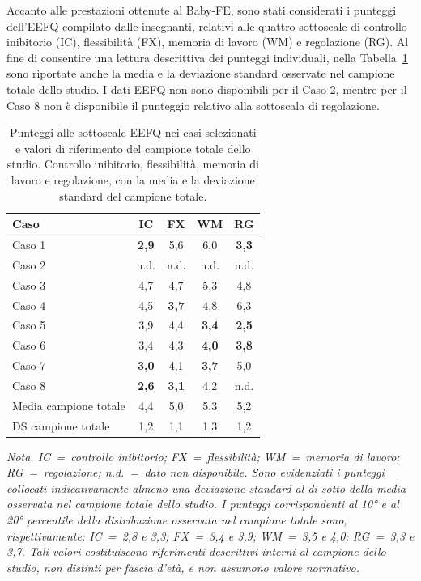 Accanto alle prestazioni ottenute al Baby-FE, sono stati considerati i punteggi dell'EEFQ compilato dalle insegnanti, relativi alle quattro sottoscale di controllo inibitorio (IC), flessibilità (FX), memoria di lavoro (WM) e regolazione (RG). Al fine di consentire una lettura descrittiva dei punteggi individuali, nella Tabella~\ref{tab:eefq} sono riportate anche la media e la deviazione standard osservate nel campione totale dello studio. I dati EEFQ non sono disponibili per il Caso 2, mentre per il Caso 8 non è disponibile il punteggio relativo alla sottoscala di regolazione.

\begin{table}[htbp]
\centering
\caption[Punteggi alle sottoscale EEFQ nei casi selezionati]{Punteggi alle sottoscale EEFQ nei casi selezionati e valori di riferimento del campione totale dello studio. Controllo inibitorio, flessibilità, memoria di lavoro e regolazione, con la media e la deviazione standard del campione totale.}
\label{tab:eefq}
\begin{tabular}{|l|c|c|c|c|}
\toprule
\textbf{Caso} & \textbf{IC} & \textbf{FX} & \textbf{WM} & \textbf{RG} \\
\midrule
Caso 1 & \textbf{2,9} & 5,6 & 6,0 & \textbf{3,3} \\
Caso 2 & n.d. & n.d. & n.d. & n.d. \\
Caso 3 & 4,7 & 4,7 & 5,3 & 4,8 \\
Caso 4 & 4,5 & \textbf{3,7} & 4,8 & 6,3 \\
Caso 5 & 3,9 & 4,4 & \textbf{3,4} & \textbf{2,5} \\
Caso 6 & 3,4 & 4,3 & \textbf{4,0} & \textbf{3,8} \\
Caso 7 & \textbf{3,0} & 4,1 & \textbf{3,7} & 5,0 \\
Caso 8 & \textbf{2,6} & \textbf{3,1} & 4,2 & n.d. \\
Media campione totale & 4,4 & 5,0 & 5,3 & 5,2 \\
DS campione totale & 1,2 & 1,1 & 1,3 & 1,2 \\
\bottomrule
\end{tabular}
\par\medskip
\begin{minipage}{\textwidth}\justifying
\emph{Nota. IC~=~controllo inibitorio; FX~=~flessibilità; WM~=~memoria di lavoro; RG~=~regolazione; n.d.~=~dato non disponibile. Sono evidenziati i punteggi collocati indicativamente almeno una deviazione standard al di sotto della media osservata nel campione totale dello studio. I punteggi corrispondenti al 10° e al 20° percentile della distribuzione osservata nel campione totale sono, rispettivamente: IC~=~2,8 e 3,3; FX~=~3,4 e 3,9; WM~=~3,5 e 4,0; RG~=~3,3 e 3,7. Tali valori costituiscono riferimenti descrittivi interni al campione dello studio, non distinti per fascia d'età, e non assumono valore normativo.}
\end{minipage}
\end{table}

